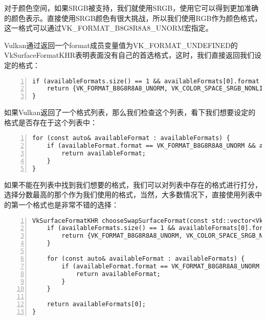 \documentclass{ctexart}
\begin{document}
对于颜色空间，如果SRGB被支持，我们就使用SRGB，使用它可以得到更加准确的颜色表示。直接使用SRGB颜色有很大挑战，所以我们使用RGB作为颜色格式，这一格式可以通过VK\_FORMAT\_B8G8R8A8\_UNORM宏指定。

Vulkan通过返回一个format成员变量值为VK\_FORMAT\_UNDEFINED的VkSurfaceFormatKHR表明表面没有自己的首选格式，这时，我们直接返回我们设定的格式：

\begin{lstlisting}[language={[ANSI]C},keywordstyle=\color{blue!70},commentstyle=\color{red!50!green!50!blue!50},frame=shadowbox, rulesepcolor=\color{red!20!green!20!blue!20},basicstyle=\small,numbers=left, numberstyle=\tiny,breaklines=true]
if (availableFormats.size() == 1 && availableFormats[0].format == VK_FORMAT_UNDEFINED) {
	return {VK_FORMAT_B8G8R8A8_UNORM, VK_COLOR_SPACE_SRGB_NONLINEAR_KHR};
}
\end{lstlisting}

如果Vulkan返回了一个格式列表，那么我们检查这个列表，看下我们想要设定的格式是否存在于这个列表中：

\begin{lstlisting}[language={[ANSI]C},keywordstyle=\color{blue!70},commentstyle=\color{red!50!green!50!blue!50},frame=shadowbox, rulesepcolor=\color{red!20!green!20!blue!20},basicstyle=\small,numbers=left, numberstyle=\tiny,breaklines=true]
for (const auto& availableFormat : availableFormats) {
	if (availableFormat.format == VK_FORMAT_B8G8R8A8_UNORM && availableFormat.colorSpace == VK_COLOR_SPACE_SRGB_NONLINEAR_KHR) {
		return availableFormat;
	}
}
\end{lstlisting}

如果不能在列表中找到我们想要的格式，我们可以对列表中存在的格式进行打分，选择分数最高的那个作为我们使用的格式，当然，大多数情况下，直接使用列表中的第一个格式也是非常不错的选择：

\begin{lstlisting}[language={[ANSI]C},keywordstyle=\color{blue!70},commentstyle=\color{red!50!green!50!blue!50},frame=shadowbox, rulesepcolor=\color{red!20!green!20!blue!20},basicstyle=\small,numbers=left, numberstyle=\tiny,breaklines=true]
VkSurfaceFormatKHR chooseSwapSurfaceFormat(const std::vector<VkSurfaceFormatKHR> &availableFormats) {
	if (availableFormats.size() == 1 && availableFormats[0].format == VK_FORMAT_UNDEFINED) {
		return {VK_FORMAT_B8G8R8A8_UNORM, VK_COLOR_SPACE_SRGB_NONLINEAR_KHR};
	}

	for (const auto& availableFormat : availableFormats) {
		if (availableFormat.format == VK_FORMAT_B8G8R8A8_UNORM && availableFormat.colorSpace == VK_COLOR_SPACE_SRGB_NONLINEAR_KHR){
			return availableFormat;
		}
	}

	return availableFormats[0];
}
\end{lstlisting}
\end{document}
